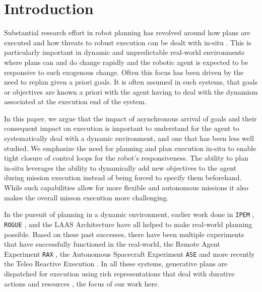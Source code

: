 \section{Introduction}
\label{sec:intro}

Substantial research effort in robot planning has revolved around how
plans are executed and how threats to robust execution can be dealt
with in-situ . This is particularly
important in dynamic and unpredictable real-world environments where
plans can and do change rapidly and the robotic agent is expected to
be responsive to such exogenous change. Often this focus has been
driven by the need to replan given a priori goals. It is often assumed
in such systems, that goals or objectives are known a priori with the
agent having to deal with the dynamism associated at the execution end
of the system. 

In this paper, we argue that the impact of asynchronous arrival of
goals and their consequent impact on execution is important to
understand for the agent to systematically deal with a dynamic
environment, and one that has been less well studied. We emphasize the
need for planning and plan execution in-situ to enable tight closure
of control loops for the robot's responsiveness.
The ability to plan in-situ leverages the ability to dynamically add
new objectives to the agent during mission execution instead of being
forced to specify them beforehand.  While such capabilities allow for
more flexible and autonomous missions it also makes the overall misson
execution more challenging.

In the pursuit of planning in a dynamic environment, earlier work done
in \texttt{IPEM} \cite{AmbrosIngerson88}, \texttt{ROGUE}
\cite{Haigh98}, and the LAAS Architecture \cite{alami:1998p820} have
all helped to make real-world planning possible. Based on these past
successes, there have been multiple experiments that have successfully
functioned in the real-world, the Remote Agent Experiment \texttt{RAX}
\cite{mus98}, the Autonomous Spacecraft Experiment \texttt{ASE}
\cite{chien99} and more recently the Teleo Reactive Execution \rxe
\cite{mcgann08b,py10}. In all these systems, generative plans are
dispatched for execution using rich representations that deal with
durative actions and resources \cite{lemai04}, the focus of our work
here.

